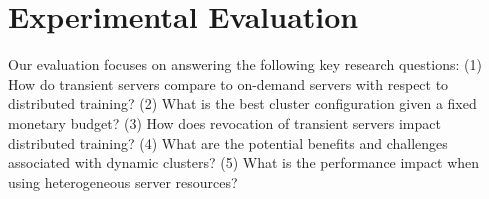 \section{Experimental Evaluation}
\label{sec:exp}




Our evaluation focuses on answering the following key research questions:
(1) How do transient servers compare to on-demand servers with respect to distributed training? 
(2) What is the best cluster configuration given a fixed monetary budget?
(3) How does revocation of transient servers impact distributed training? 
(4) What are the potential benefits and challenges associated with dynamic clusters? 
(5) What is the performance impact when using heterogeneous server resources? 


